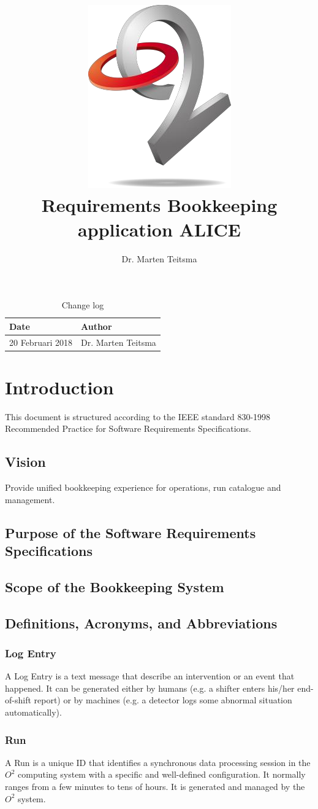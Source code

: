 \documentclass[a4paper,11pt]{book}
\title{\includegraphics{o2.png}\\Requirements Bookkeeping application ALICE}
\author{Dr. Marten Teitsma}
\begin{document}
\maketitle

\begin{table}
\begin{tabular}{p{6cm}p{6cm}}
\hline
Date  & Author\\
\hline
\hline
20 Februari 2018   & Dr. Marten Teitsma\\
\hline
\end{tabular}
\caption{Change log}
\end{table}


\tableofcontents
\chapter{Introduction}
This document is structured according to the IEEE standard 830-1998 Recommended Practice for Software Requirements Specifications.

\section{Vision}
 Provide unified bookkeeping experience for operations, run catalogue and management.
 
\section{Purpose of the Software Requirements Specifications}

\section{Scope of the Bookkeeping System}

\section{Definitions, Acronyms, and Abbreviations}

\subsection{Log Entry}
A Log Entry is a text message that describe an intervention or an event that happened. It can be generated either by humans (e.g. a shifter enters his/her end-of-shift report) or by machines (e.g. a detector logs some abnormal situation automatically). 

\subsection{Run}
A Run is a unique ID that identifies a synchronous data processing session in the $O^2$ computing system with a specific and well-defined configuration. It normally ranges from a few minutes to tens of hours. It is generated and managed by the $O^2$ system. 
\end{document}
